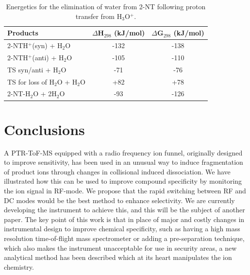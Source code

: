 \begin{table}%
\caption{Energetics for the elimination of water from 2-NT following proton transfer from H$_3$O$^+$.}
\label{table:RF:tab4}
\begin{tabular}{lcc}
\hline
\textbf{Products} & \textbf{$\Delta$H$_{298}$ (kJ/mol)} & \textbf{$\Delta$G$_{298}$ (kJ/mol)} \\
\hline
2-NTH$^+$(syn) + H$_2$O         & -132  & -138   \\
2-NTH$^+$(anti) + H$_2$O        & -105  & -110  \\
TS syn/anti + H$_2$O            & -71  & -76  \\
TS for loss of H$_2$O + H$_2$O  & +82 & +78  \\
2-NT-H$_2$O  + 2H$_2$O          & -93 & -126 \\
\hline
\end{tabular}
\end{table}





\section{Conclusions}
A PTR-ToF-MS equipped with a radio frequency ion funnel, originally designed to improve sensitivity, has been used in an unusual way to induce fragmentation of product ions through changes in collisional induced dissociation. We have illustrated how this can be used to improve compound specificity by monitoring the ion signal in RF-mode. We propose that the rapid switching between RF and DC modes would be the best method to enhance selectivity. We are currently developing the instrument to achieve this, and this will be the subject of another paper. The key point of this work is that in place of major and costly changes in instrumental design to improve chemical specificity, such as having a high mass resolution time-of-flight mass spectrometer or adding a pre-separation technique, which also makes the instrument unacceptable for use in security areas, a new analytical method has been described which at its heart manipulates the ion chemistry.





